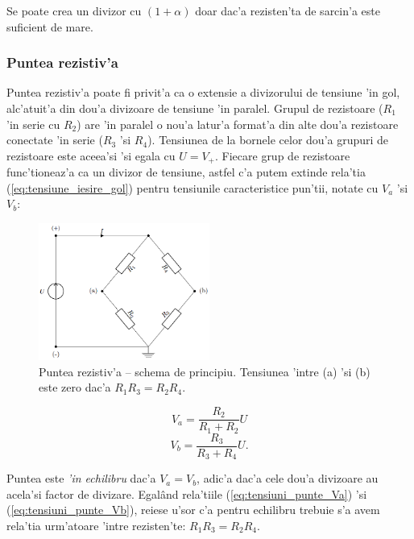 \begin{retine}
Se poate crea un divizor cu $(1+\alpha)$ doar dac'a rezisten'ta de sarcin'a este suficient de mare.
\end{retine}

\subsubsection*{\color{blue} Puntea rezistiv'a} %

Puntea rezistiv'a poate fi privit'a ca o extensie a divizorului de tensiune 'in gol, alc'atuit'a din dou'a divizoare de tensiune 'in  paralel. Grupul de rezistoare ($R_1$ 'in serie cu $R_2$) are 'in paralel o nou'a latur'a format'a din alte dou'a rezistoare conectate 'in serie ($R_3$ 'si $R_4$). Tensiunea de la bornele celor dou'a grupuri de rezistoare este aceea'si 'si egala cu $U=V_+$. Fiecare grup de rezistoare func'tioneaz'a ca un divizor de tensiune, astfel c'a putem extinde rela'tia (\ref{eq:tensiune_iesire_gol}) pentru tensiunile caracteristice pun'tii, notate cu $V_a$ 'si $V_b$:

\begin{figure}[!b]
	\centering
		\includegraphics[width=0.5\textwidth]{laborator_01/figuri/scheme_punte_rezistiva}
	\caption{Puntea rezistiv'a -- schema de principiu. Tensiunea 'intre (a) 'si (b) este zero dac'a $R_1 R_3 = R_2 R_4$.}
	\label{fig:punte_rezistiva_schema}
\end{figure}

\begin{equation} \label{eq:tensiuni_punte_Va}
V_a = \frac{R_2}{R_1+R_2}U
\end{equation}
\begin{equation} \label{eq:tensiuni_punte_Vb}
V_b = \frac{R_3}{R_3+R_4}U.
\end{equation}

Puntea este \textit{'in echilibru} dac'a $V_a=V_b$, adic'a dac'a cele dou'a
divizoare au acela'si factor de divizare. Egal\^and rela'tiile (\ref{eq:tensiuni_punte_Va}) 'si (\ref{eq:tensiuni_punte_Vb}), reiese u'sor c'a pentru echilibru trebuie s'a avem rela'tia urm'atoare 'intre rezisten'te: $R_1 R_3 = R_2 R_4$.

